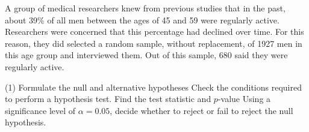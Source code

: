 \documentclass[../mathNotesPreamble]{subfiles}
\begin{document}
  \begin{ex*}
    A group of medical researchers knew from previous studies that in the past, about 39\% of all men between the ages of 45 and 59 were regularly active. Researchers were concerned that this percentage had declined over time. For this reason, they did selected a random sample, without replacement, of 1927 men in this age group and interviewed them. Out of this sample, 680 said they were regularly active.
  \end{ex*}
  \begin{extasks}[after-item-skip=\stretch{1}](1)
    \task Formulate the null and alternative hypotheses
    \task Check the conditions required to perform a hypothesis test.
    \task Find the test statistic and $p$-value
    \task Using a significance level of $\alpha=0.05$, decide whether to reject or fail to reject the null hypothesis.
  \end{extasks}
  \pagebreak

  \pagebreak
\end{document}
